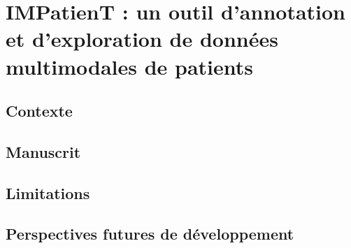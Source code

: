 \chapter{IMPatienT : un outil d’annotation et d’exploration de données multimodales de patients}

\section{Contexte}
\section{Manuscrit}
\section{Limitations}
\section{Perspectives futures de développement}